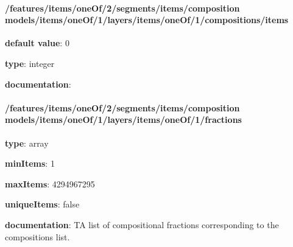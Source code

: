 \begin{itemized}
\paragraph{/features/items/oneOf/2/segments/items/composition models/items/oneOf/1/layers/items/oneOf/1/compositions/items} \begin{itemized}
\item {\bf default value}: 0
\item {\bf type}: integer
\item {\bf documentation}: 
\end{itemized}\end{itemized}\paragraph{/features/items/oneOf/2/segments/items/composition models/items/oneOf/1/layers/items/oneOf/1/fractions} \begin{itemized}
\item {\bf type}: array
\item {\bf minItems}: 1
\item {\bf maxItems}: 4294967295
\item {\bf uniqueItems}: false
\item {\bf documentation}: TA list of compositional fractions corresponding to the compositions list.

\end{itemized}
